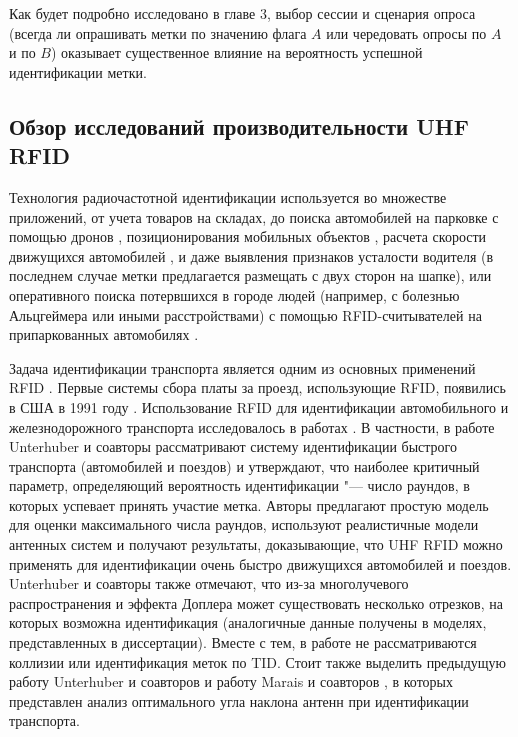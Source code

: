 Как будет подробно исследовано в главе 3, выбор сессии и сценария опроса (всегда ли опрашивать метки по значению флага $A$ или чередовать опросы по $A$ и по $B$) оказывает существенное влияние на вероятность успешной идентификации метки.



\subsection{Обзор исследований производительности UHF RFID}\label{sec:ch1_rfid_observe}

Технология радиочастотной идентификации \cite{Finkenzeller2010, Dobkin2008} используется во множестве приложений, от учета товаров на складах, до поиска автомобилей на парковке с помощью дронов \cite{Wu2019}, позиционирования мобильных объектов \cite{Cho2013, Park2013, Errington2010}, расчета скорости движущихся автомобилей \cite{Zhai2018, Choy2020, Jing2013}, и даже выявления признаков усталости водителя \cite{Yang2020} (в последнем случае метки предлагается размещать с двух сторон на шапке), или оперативного поиска потервшихся в городе людей (например, с болезнью Альцгеймера или иными расстройствами) с помощью RFID-считывателей на припаркованных автомобилях \cite{Griggs2018}.

Задача идентификации транспорта является одним из основных применений RFID \cite{StdRainEviWhitepaper}. Первые системы сбора платы за проезд, использующие RFID, появились в США в 1991 году \cite{Landt2005}. Использование RFID для идентификации автомобильного и железнодорожного транспорта исследовалось в работах \cite{Gonzalez2013, Blythe1999, Khan2011, Yoon2008, Al-Naima2011, Tseng2007, Kostrominov2020, Unterhuber2019, Unterhuber2020, Unterhuber2019, Pawowicz2020, Choy2020, Jo2009, Zhang2010, MenesesGonzalez2011, Lonkar2018, Balbin2017, Bhavke2017, Zhang2011, Zhang2010a, Pandit2009, Sundar2015}. В частности, в работе \cite{Unterhuber2020} Unterhuber и соавторы рассматривают систему идентификации быстрого транспорта (автомобилей и поездов) и утверждают, что наиболее критичный параметр, определяющий вероятность идентификации "--- число раундов, в которых успевает принять участие метка. Авторы предлагают простую модель для оценки максимального числа раундов, используют реалистичные модели антенных систем и получают результаты, доказывающие, что UHF RFID можно применять для идентификации очень быстро движущихся автомобилей и поездов. Unterhuber и соавторы также отмечают, что из-за многолучевого распространения и эффекта Доплера может существовать несколько отрезков, на которых возможна идентификация (аналогичные данные получены в моделях, представленных в диссертации). Вместе с тем, в работе \cite{Unterhuber2020} не рассматриваются коллизии или идентификация меток по TID. Стоит также выделить предыдущую работу Unterhuber и соавторов \cite{Unterhuber2019} и работу Marais и соавторов \cite{Marais2013}, в которых представлен анализ оптимального угла наклона антенн при идентификации транспорта.

